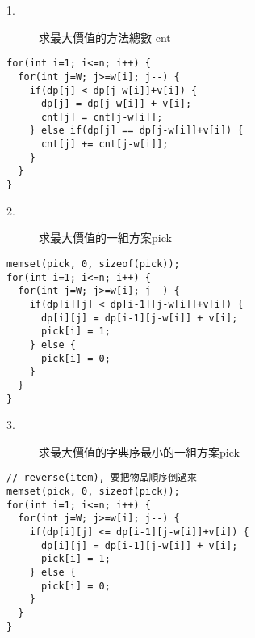 \begin{center}
  \underline{  \bf{}  }
\end{center}

\begin{description}
  \item[1.] 求最大價值的方法總數 cnt
\end{description}
\begin{lstlisting}
for(int i=1; i<=n; i++) {
  for(int j=W; j>=w[i]; j--) {
    if(dp[j] < dp[j-w[i]]+v[i]) {
      dp[j] = dp[j-w[i]] + v[i];
      cnt[j] = cnt[j-w[i]];
    } else if(dp[j] == dp[j-w[i]]+v[i]) {
      cnt[j] += cnt[j-w[i]];
    }
  }
}
\end{lstlisting}

\begin{description}
  \item[2.] 求最大價值的一組方案pick
\end{description}
\begin{lstlisting}
memset(pick, 0, sizeof(pick));
for(int i=1; i<=n; i++) {
  for(int j=W; j>=w[i]; j--) {
    if(dp[i][j] < dp[i-1][j-w[i]]+v[i]) {
      dp[i][j] = dp[i-1][j-w[i]] + v[i];
      pick[i] = 1;
    } else {
      pick[i] = 0;
    }
  }
}
\end{lstlisting}

\begin{description}
  \item[3.] 求最大價值的字典序最小的一組方案pick
\end{description}
\begin{lstlisting}
// reverse(item), 要把物品順序倒過來
memset(pick, 0, sizeof(pick));
for(int i=1; i<=n; i++) {
  for(int j=W; j>=w[i]; j--) {
    if(dp[i][j] <= dp[i-1][j-w[i]]+v[i]) {
      dp[i][j] = dp[i-1][j-w[i]] + v[i];
      pick[i] = 1;
    } else {
      pick[i] = 0;
    }
  }
}
\end{lstlisting}